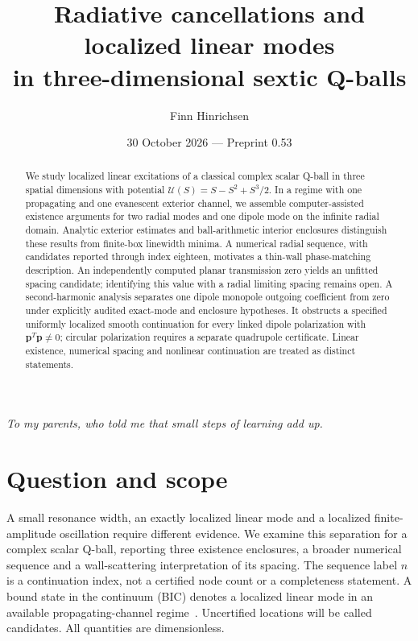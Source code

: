 \documentclass[a4paper,11pt]{article}
\title{Radiative cancellations and localized linear modes\\in three-dimensional sextic Q-balls}
\author{Finn Hinrichsen}
\date{30 October 2026 --- Preprint 0.53}
\begin{document}
\maketitle
\begin{center}
{\small\emph{To my parents, who told me that small steps of learning add up.}}
\end{center}
\begin{abstract}
We study localized linear excitations of a classical complex scalar Q-ball in three
spatial dimensions with potential $\mathcal U(S)=S-S^2+S^3/2$.
In a regime with one propagating and one evanescent exterior channel,
we assemble computer-assisted existence arguments for two radial modes
and one dipole mode on the infinite radial domain. Analytic exterior
estimates and ball-arithmetic interior enclosures distinguish these
results from finite-box linewidth minima. A numerical radial sequence,
with candidates reported through index eighteen, motivates a thin-wall
phase-matching description. An independently computed planar transmission
zero yields an unfitted spacing candidate; identifying this value with
a radial limiting spacing remains open. A second-harmonic analysis
separates one dipole monopole outgoing coefficient from zero under
explicitly audited exact-mode and enclosure hypotheses. It obstructs a
specified uniformly localized smooth continuation for every linked dipole
polarization with $\boldsymbol p^T\boldsymbol p\ne0$; circular polarization
requires a separate quadrupole certificate. Linear existence, numerical
spacing and nonlinear continuation are treated as distinct statements.
\end{abstract}



\section{Question and scope}\label{sec:scope}
A small resonance width, an exactly localized linear mode and a localized
finite-amplitude oscillation require different evidence. We examine this
separation for a complex scalar Q-ball, reporting three existence
enclosures, a broader numerical sequence and a wall-scattering
interpretation of its spacing. The sequence label $n$ is a continuation
index, not a certified node count or a completeness statement.
A bound state in the continuum (BIC) denotes a localized linear mode in
an available propagating-channel regime~\cite{Hsu2016}. Uncertified
locations will be called candidates. All quantities are dimensionless.

\end{document}
